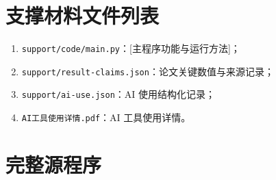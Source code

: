 \section{支撑材料文件列表}

\begin{enumerate}
  \item \texttt{support/code/main.py}：[主程序功能与运行方法]；
  \item \texttt{support/result-claims.json}：论文关键数值与来源记录；
  \item \texttt{support/ai-use.json}：AI 使用结构化记录；
  \item \texttt{AI工具使用详情.pdf}：AI 工具使用详情。
\end{enumerate}

\section{完整源程序}


